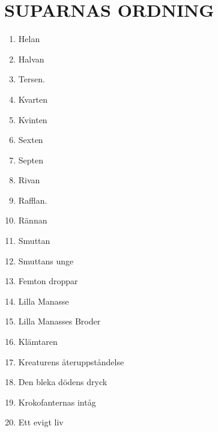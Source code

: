 \documentclass[a6paper,fontsize=10pt,twoside,open=right]{scrbook}
\begin{document}
\section{SUPARNAS ORDNING}
\vspace{10pt}
\begin{enumerate}[leftmargin=0.65cm,topsep=0pt,itemsep=0pt,partopsep=0pt,parsep=3pt]
\item Helan
\item Halvan
\item Tersen.
\item Kvarten
\item Kvinten
\item Sexten
\item Septen
\item Rivan
\item Rafflan.
\item Rännan
\item Smuttan
\item Smuttans unge
\item Femton droppar
\item Lilla Manasse
\item Lilla Manasses Broder
\item Klämtaren
\item Kreaturens återuppståndelse
\item Den bleka dödens dryck
\item Krokofanternas intåg
\item Ett evigt liv
\end{enumerate}
\newpage
\end{document}
